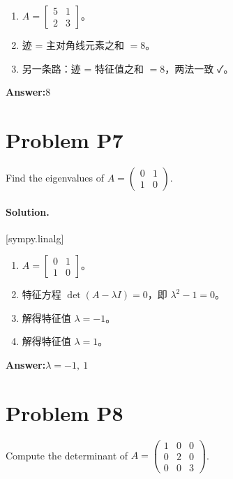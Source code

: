 \documentclass[11pt,a4paper]{ctexart}
\newcommand{\solvertag}[1]{{\footnotesize\color{gray}\textsf{[#1]}}}
\begin{document}
\begin{enumerate}[leftmargin=*]
  \item $A = \left[\begin{matrix}5 & 1\\2 & 3\end{matrix}\right]$。
  \item 迹 = 主对角线元素之和 $= 8$。
  \item 另一条路：迹 = 特征值之和 $= 8$，两法一致 ✓。
\end{enumerate}

\noindent\textbf{Answer:}\quad $8$

\medskip

\section*{Problem P7}
Find the eigenvalues of $A = \begin{pmatrix} 0 & 1 \\ 1 & 0 \end{pmatrix}$.

\paragraph{Solution.} \solvertag{sympy.linalg} 

\begin{enumerate}[leftmargin=*]
  \item $A = \left[\begin{matrix}0 & 1\\1 & 0\end{matrix}\right]$。
  \item 特征方程 $\det(A - \lambda I) = 0$，即 $\lambda^{2} - 1 = 0$。
  \item 解得特征值 $\lambda = -1$。
  \item 解得特征值 $\lambda = 1$。
\end{enumerate}

\noindent\textbf{Answer:}\quad $\lambda = -1,\ 1$

\medskip

\section*{Problem P8}
Compute the determinant of $A = \begin{pmatrix} 1 & 0 & 0 \\ 0 & 2 & 0 \\ 0 & 0 & 3 \end{pmatrix}$.
\end{document}

